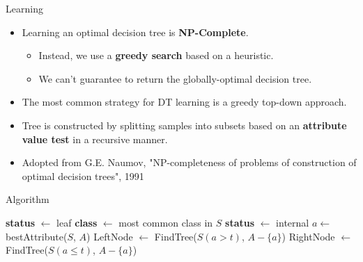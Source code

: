 \documentclass[serif, aspectratio=169]{beamer}
\begin{document}
\begin{frame}{Learning}
    \begin{itemize}
        \itemsep1em
        \justifying
        \item Learning an optimal decision tree is \textbf{NP-Complete}.
        \begin{itemize}
            \itemsep0.25em
            \item Instead, we use a \textbf{greedy search} based on a heuristic.
            \item We can't guarantee to return the globally-optimal decision tree.
        \end{itemize}
        \item The most common strategy for DT learning is a greedy top-down approach.
        \item Tree is constructed by splitting samples into subsets based on an \textbf{attribute value test} in a recursive manner.
        \item[] \begin{center}
            Adopted from G.E. Naumov, "NP-completeness of problems of construction of optimal decision trees", 1991
        \end{center}
    \end{itemize}
\end{frame}

\begin{frame}{Algorithm}
    \begin{algorithm}[H]
    \caption{Constructing DT}\label{alg:DT}
    \begin{algorithmic}[1]
     
            \State \textbf{status} $\gets$ leaf
            \State \textbf{class} $\gets$ most common class in $S$
        \Else
            \State \textbf{status} $\gets$ internal
            \State $a \gets$ \textcolor{deepred}{bestAttribute($S$, $A$)} 
            \State LeftNode $\gets$ FindTree($S(a > t)$, $A - \{a\}$) 
            \State RightNode $\gets$ FindTree($S(a \leq t)$, $A - \{a\}$)
        \EndIf
    \EndProcedure
    \end{algorithmic}
    \end{algorithm}
\end{frame}
\end{document}
